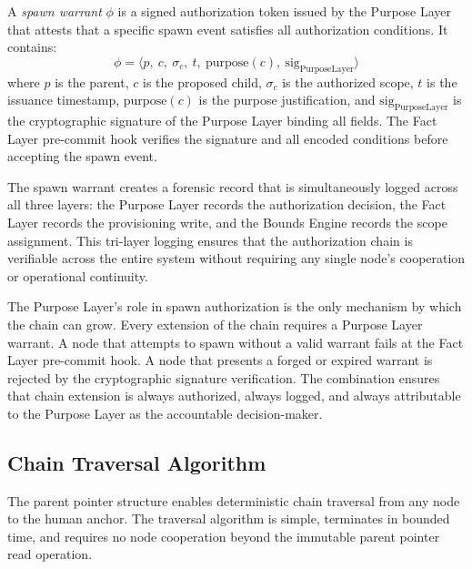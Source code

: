 \begin{dfn}
\label{def:spawn-warrant}
A \emph{spawn warrant} $\phi$ is a signed authorization token issued by the Purpose Layer that attests that a specific spawn event satisfies all authorization conditions. It contains:
\begin{equation}
\phi = \langle p,\ c,\ \sigma_c,\ t,\ \mathrm{purpose}(c),\ \mathrm{sig}_{\mathrm{PurposeLayer}} \rangle
\end{equation}
where $p$ is the parent, $c$ is the proposed child, $\sigma_c$ is the authorized scope, $t$ is the issuance timestamp, $\mathrm{purpose}(c)$ is the purpose justification, and $\mathrm{sig}_{\mathrm{PurposeLayer}}$ is the cryptographic signature of the Purpose Layer binding all fields. The Fact Layer pre-commit hook verifies the signature and all encoded conditions before accepting the spawn event.
\end{dfn}

The spawn warrant creates a forensic record that is simultaneously logged across all three layers: the Purpose Layer records the authorization decision, the Fact Layer records the provisioning write, and the Bounds Engine records the scope assignment. This tri-layer logging ensures that the authorization chain is verifiable across the entire system without requiring any single node's cooperation or operational continuity.

The Purpose Layer's role in spawn authorization is the only mechanism by which the chain can grow. Every extension of the chain requires a Purpose Layer warrant. A node that attempts to spawn without a valid warrant fails at the Fact Layer pre-commit hook. A node that presents a forged or expired warrant is rejected by the cryptographic signature verification. The combination ensures that chain extension is always authorized, always logged, and always attributable to the Purpose Layer as the accountable decision-maker.

\subsection{Chain Traversal Algorithm}
\label{sec:chain-traversal-algorithm}

The parent pointer structure enables deterministic chain traversal from any node to the human anchor. The traversal algorithm is simple, terminates in bounded time, and requires no node cooperation beyond the immutable parent pointer read operation.

